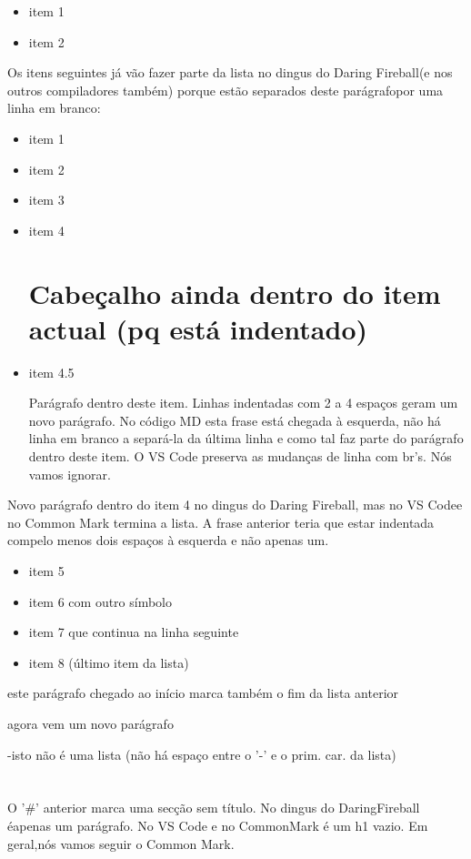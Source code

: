 \documentclass{article}
\begin{document}
\begin{itemize}
\item  item 1
\item  item 2
\end{itemize}
Os itens seguintes já vão fazer parte da lista no dingus do Daring Fireball(e nos outros compiladores também) porque estão separados deste parágrafopor uma linha em branco:

\begin{itemize}
\item  item 1


\item  item 2


\item  item 3


\item  item 4

\section*{Cabeçalho ainda dentro do item actual (pq está indentado)}

\item  item 4.5

  Parágrafo dentro deste item. Linhas indentadas com 2 a 4 espaços geram
  um novo parágrafo.
  No código MD esta frase está chegada à esquerda, não há linha em branco a
  separá-la da última linha e como tal faz parte do parágrafo dentro deste item.
  O VS Code preserva as mudanças de linha com br's. Nós vamos ignorar.


\end{itemize}
Novo parágrafo dentro do item 4 no dingus do Daring Fireball, mas no VS Codee no Common Mark termina a lista. A frase anterior teria que estar indentada compelo menos dois espaços à esquerda e não apenas um.

\begin{itemize}
\item  item 5
\item  item 6 com outro símbolo
\item  item 7
  que continua na linha seguinte
\item  item 8 (último item da lista)
\end{itemize}
este parágrafo chegado ao início marca também o fim da lista anterior

agora vem um novo parágrafo

-isto não é uma lista  (não há espaço entre o '-' e o prim. car. da lista)

\section*{}
O '\#' anterior marca uma secção sem título. No dingus do DaringFireball éapenas um parágrafo. No VS Code e no CommonMark é um h1 vazio. Em geral,nós vamos seguir o Common Mark.
\end{document}
